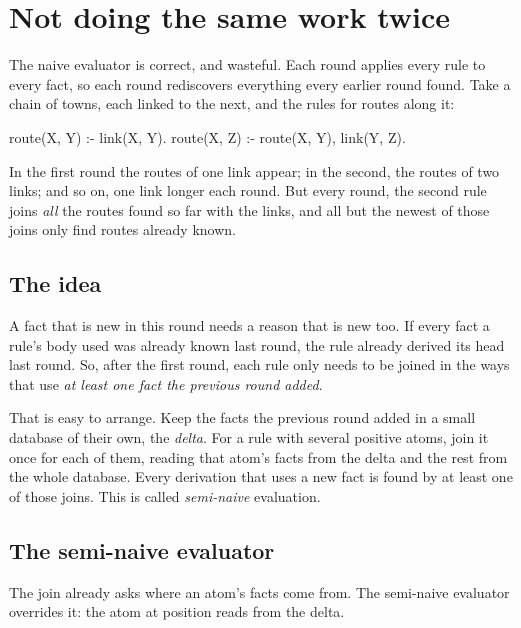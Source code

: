\chapter{Not doing the same work twice}\label{ch:seminaive}

The naive evaluator is correct, and wasteful. Each round applies every rule
to every fact, so each round rediscovers everything every earlier round
found. Take a chain of towns, each linked to the next, and the rules for
routes along it:

\begin{shell}
route(X, Y) :- link(X, Y).
route(X, Z) :- route(X, Y), link(Y, Z).
\end{shell}

In the first round the routes of one link appear; in the second, the routes
of two links; and so on, one link longer each round. But every round, the
second rule joins \emph{all} the routes found so far with the links, and
all but the newest of those joins only find routes already known.

\section{The idea}

A fact that is new in this round needs a reason that is new too. If every
fact a rule's body used was already known last round, the rule already
derived its head last round. So, after the first round, each rule only
needs to be joined in the ways that use \emph{at least one fact the
previous round added}.

That is easy to arrange. Keep the facts the previous round added in a small
database of their own, the \emph{delta}. For a rule with several positive
atoms, join it once for each of them, reading that atom's facts from the
delta and the rest from the whole database. Every derivation that uses a
new fact is found by at least one of those joins. This is called
\emph{semi-naive} evaluation.

\section{The semi-naive evaluator}

The join already asks  where an atom's facts come from. The
semi-naive evaluator overrides it: the atom at position 
reads from the delta.


